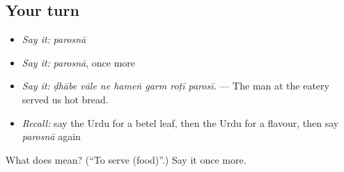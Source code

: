 \subsection*{Your turn}
\begin{itemize}
\raggedright
  \item \emph{Say it:} \emph{parosnā}
  \item \emph{Say it:} \emph{parosnā}, once more
  \item \emph{Say it:} \emph{ḍhābe vāle ne hameṅ garm roṭī parosī.} — The man at the eatery served us hot bread.
  \item \emph{Recall:} say the Urdu for a betel leaf, then the Urdu for a flavour, then say \emph{parosnā} again
\end{itemize}

\begin{tcolorbox}[breakable,colback=teal!4,colframe=teal!35!black,title={Before you move on}]
What does  mean? (\textquotedblleft{}To serve (food)\textquotedblright{}.) Say it once more.
\end{tcolorbox}
